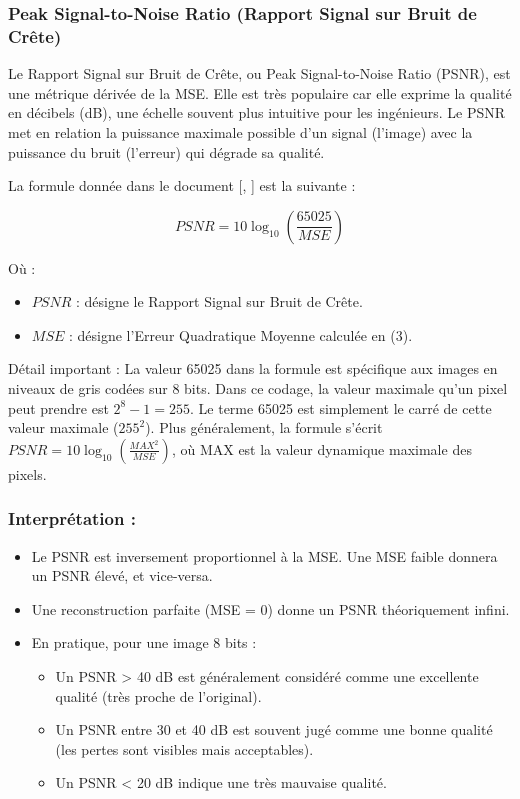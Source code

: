 \subsubsection{Peak Signal-to-Noise Ratio (Rapport Signal sur Bruit de Crête)}

Le Rapport Signal sur Bruit de Crête, ou Peak Signal-to-Noise Ratio (PSNR), est une métrique dérivée de la MSE. Elle est très populaire car elle exprime la qualité en décibels (dB), une échelle souvent plus intuitive pour les ingénieurs. Le PSNR met en relation la puissance maximale possible d'un signal (l'image) avec la puissance du bruit (l'erreur) qui dégrade sa qualité.

La formule donnée dans le document [\cite{24}, \cite{25}] est la suivante :

\begin{equation}
PSNR = 10 \log_{10} \left( \frac{65025}{MSE} \right)
\end{equation}

Où :
\begin{itemize}
\item[-] \(PSNR\) : désigne le Rapport Signal sur Bruit de Crête.
\item[-] \(MSE\) : désigne l'Erreur Quadratique Moyenne calculée en (3).
\end{itemize}

Détail important : La valeur 65025 dans la formule est spécifique aux images en niveaux de gris codées sur 8 bits. Dans ce codage, la valeur maximale qu'un pixel peut prendre est \(2^8 - 1 = 255\). Le terme 65025 est simplement le carré de cette valeur maximale (\(255^2\)). Plus généralement, la formule s'écrit \( PSNR = 10 \log_{10} \left( \frac{MAX^2}{MSE} \right) \), où MAX est la valeur dynamique maximale des pixels.

\subsubsection*{Interprétation :}
\begin{itemize}
    \item Le PSNR est inversement proportionnel à la MSE. Une MSE faible donnera un PSNR élevé, et vice-versa.
    \item Une reconstruction parfaite (MSE = 0) donne un PSNR théoriquement infini.
    \item En pratique, pour une image 8 bits :
    \begin{itemize}
        \item Un PSNR > 40 dB est généralement considéré comme une excellente qualité (très proche de l'original).
        \item Un PSNR entre 30 et 40 dB est souvent jugé comme une bonne qualité (les pertes sont visibles mais acceptables).
        \item Un PSNR < 20 dB indique une très mauvaise qualité.
    \end{itemize}
\end{itemize}

